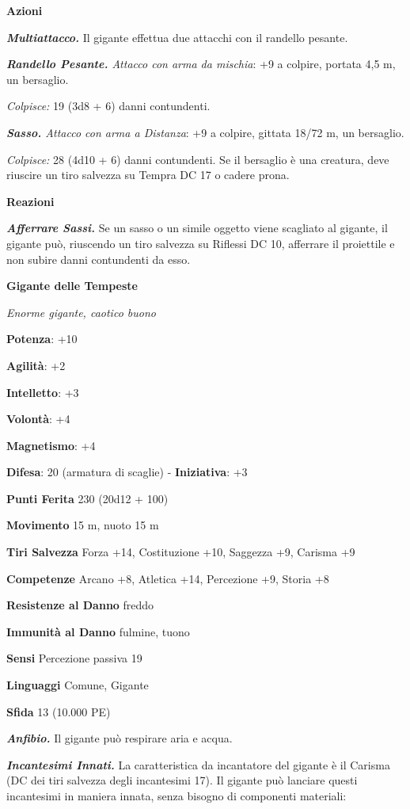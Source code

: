 \begin{multicols}{2}
\smallskip\textbf{Azioni}

\emph{\textbf{Multiattacco.}} Il gigante effettua due attacchi con il
randello pesante.

\emph{\textbf{Randello Pesante.} Attacco con arma da mischia}: +9 a
colpire, portata 4,5 m, un bersaglio.

\emph{Colpisce:} 19 (3d8 + 6) danni contundenti.

\emph{\textbf{Sasso.} Attacco con arma a Distanza}: +9 a colpire,
gittata 18/72 m, un bersaglio.

\emph{Colpisce:} 28 (4d10 + 6) danni contundenti. Se il bersaglio è una
creatura, deve riuscire un tiro salvezza su Tempra DC 17 o cadere prona.

\textbf{Reazioni}

\emph{\textbf{Afferrare Sassi.}} Se un sasso o un simile oggetto viene
scagliato al gigante, il gigante può, riuscendo un tiro salvezza su Riflessi DC 10, afferrare il proiettile e non subire danni contundenti
da esso.

\textbf{Gigante delle Tempeste}

\emph{Enorme gigante, caotico buono}

\textbf{Potenza}: +10

\textbf{Agilità}: +2

\textbf{Intelletto}: +3

\textbf{Volontà}: +4

\textbf{Magnetismo}: +4

\textbf{Difesa}: 20 (armatura di scaglie) - \textbf{Iniziativa}: +3

\textbf{Punti Ferita} 230 (20d12 + 100)

\textbf{Movimento} 15 m, nuoto 15 m

\textbf{Tiri Salvezza} Forza +14, Costituzione +10, Saggezza +9, Carisma
+9

\textbf{Competenze} Arcano +8, Atletica +14, Percezione +9, Storia +8

\textbf{Resistenze al Danno} freddo

\textbf{Immunità al Danno} fulmine, tuono

\textbf{Sensi} Percezione passiva 19

\textbf{Linguaggi} Comune, Gigante

\textbf{Sfida} 13 (10.000 PE)\smallskip

\emph{\textbf{Anfibio.}} Il gigante può respirare aria e acqua.

\emph{\textbf{Incantesimi Innati.}} La caratteristica da incantatore del
gigante è il Carisma (DC dei tiri salvezza degli incantesimi 17). Il
gigante può lanciare questi incantesimi in maniera innata, senza bisogno
di componenti materiali:


\end{multicols}
